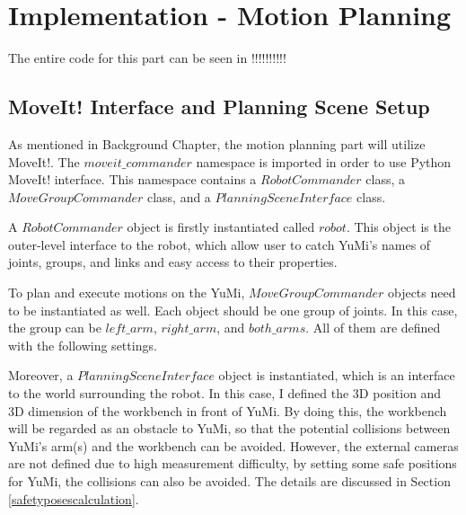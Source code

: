 \chapter{Implementation - Motion Planning}

The entire code for this part can be seen in !!!!!!!!!!

\section{MoveIt! Interface and Planning Scene Setup}
As mentioned in Background Chapter, the motion planning part will utilize MoveIt!. The $moveit\_commander$ namespace is imported in order to use Python MoveIt! interface. This namespace contains a $RobotCommander$ class, a $MoveGroupCommander$ class, and a $PlanningSceneInterface$ class.

A $RobotCommander$ object is firstly instantiated called $robot$. This object is the outer-level interface to the robot, which allow user to catch YuMi's names of joints, groups, and links and easy access to their properties.

To plan and execute motions on the YuMi, $MoveGroupCommander$ objects need to be instantiated as well. Each object should be one group of joints. In this case, the group can be $left\_arm$, $right\_arm$, and $both\_arms$. All of them are defined with the following settings.

\begin{table}[H]
\centering
{}
\caption{Settings of three $MoveGroupCommander$ objects}
\label{armsetup}
\end{table}

Moreover, a $PlanningSceneInterface$ object is instantiated, which is an interface to the world surrounding the robot. In this case, I defined the 3D position and 3D dimension of the workbench in front of YuMi. By doing this, the workbench will be regarded as an obstacle to YuMi, so that the potential collisions between YuMi's arm(s) and the workbench can be avoided. However, the external cameras are not defined due to high measurement difficulty, by setting some safe positions for YuMi, the collisions can also be avoided. The details are discussed in Section \ref{safetyposescalculation}.

